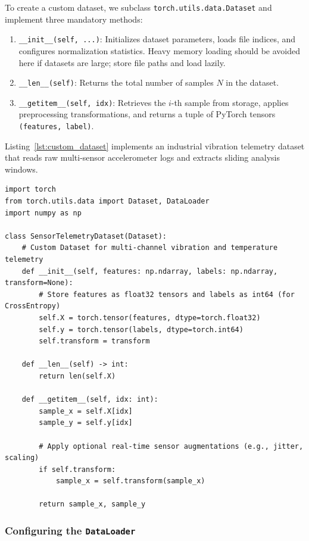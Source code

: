 To create a custom dataset, we subclass \texttt{torch.utils.data.Dataset} and implement three mandatory methods:
\begin{enumerate}
    \item \texttt{\_\_init\_\_(self, ...)}: Initializes dataset parameters, loads file indices, and configures normalization statistics. Heavy memory loading should be avoided here if datasets are large; store file paths and load lazily.
    \item \texttt{\_\_len\_\_(self)}: Returns the total number of samples $N$ in the dataset.
    \item \texttt{\_\_getitem\_\_(self, idx)}: Retrieves the $i$-th sample from storage, applies preprocessing transformations, and returns a tuple of PyTorch tensors \texttt{(features, label)}.
\end{enumerate}

Listing~\ref{lst:custom_dataset} implements an industrial vibration telemetry dataset that reads raw multi-sensor accelerometer logs and extracts sliding analysis windows.

\begin{lstlisting}[style=pythonstyle, caption={Custom PyTorch Dataset for multi-channel sensor telemetry.}, label={lst:custom_dataset}]
import torch
from torch.utils.data import Dataset, DataLoader
import numpy as np

class SensorTelemetryDataset(Dataset):
    # Custom Dataset for multi-channel vibration and temperature telemetry
    def __init__(self, features: np.ndarray, labels: np.ndarray, transform=None):
        # Store features as float32 tensors and labels as int64 (for CrossEntropy)
        self.X = torch.tensor(features, dtype=torch.float32)
        self.y = torch.tensor(labels, dtype=torch.int64)
        self.transform = transform

    def __len__(self) -> int:
        return len(self.X)

    def __getitem__(self, idx: int):
        sample_x = self.X[idx]
        sample_y = self.y[idx]

        # Apply optional real-time sensor augmentations (e.g., jitter, scaling)
        if self.transform:
            sample_x = self.transform(sample_x)

        return sample_x, sample_y
\end{lstlisting}

\subsubsection{Configuring the \texttt{DataLoader}}

